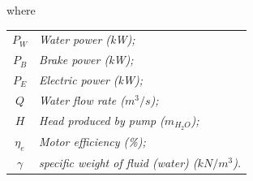 
where\\
\begin{table}[h]
	\hspace*{1.0cm}
	{\footnotesize
		\begin{tabular}{l|l}
			\multicolumn{1}{c}{$P_W$} & \textit{Water power (kW);}  \\ 
			\multicolumn{1}{c}{$P_B$} & \textit{Brake power (kW);}  \\ 
			\multicolumn{1}{c}{$P_E$} & \textit{Electric power (kW);}  \\ 
			\multicolumn{1}{c}{$Q$} & \textit{Water flow rate ($m^3/s$);}  \\ 
			\multicolumn{1}{c}{$H$} &\textit{ Head produced by pump ($m_{H_2O}$);}\\ 
			\multicolumn{1}{c}{$\eta_e$} &\textit{Motor efficiency (\%); } \\			
			\multicolumn{1}{c}{$\gamma$} &\textit{specific weight of fluid (water) ($kN/m^3$). } \\						
		\end{tabular}
	}
\end{table}




